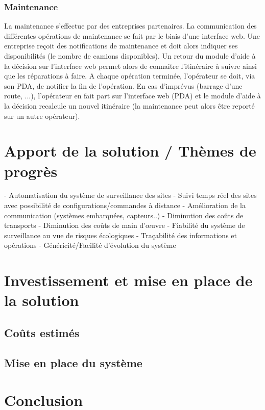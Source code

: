     \subsubsection{Maintenance}
La maintenance s'effectue par des entreprises partenaires. La communication des différentes opérations de maintenance se fait par le biais d'une interface web. Une entreprise reçoit des notifications de maintenance et doit alors indiquer ses disponibilités (le nombre de camions disponibles). Un retour du module d'aide à la décision sur l'interface web permet alors de connaitre l'itinéraire à suivre ainsi que les réparations à faire. A chaque opération terminée, l'opérateur se doit, via son PDA, de notifier la fin de l'opération. En cas d'imprévus (barrage d'une route, ...), l'opérateur en fait part sur l'interface web (PDA) et le module d'aide à la décision recalcule un nouvel itinéraire (la maintenance peut alors être reporté sur un autre opérateur). 
     
\section{Apport de la solution / Thèmes de progrès}


- Automatisation du système de surveillance des sites
- Suivi temps réel des sites avec possibilité de configurations/commandes à distance
- Amélioration de la communication (systèmes embarquées, capteurs..)
- Diminution des coûts de transports
- Diminution des coûts de main d'œuvre
- Fiabilité du système de surveillance au vue de risques écologiques
- Traçabilité des informations et opérations
- Généricité/Facilité d'évolution du système


\section{Investissement et mise en place de la solution}  
  \subsection{Coûts estimés}
  
  \subsection{Mise en place du système}
  

\section{Conclusion}  
